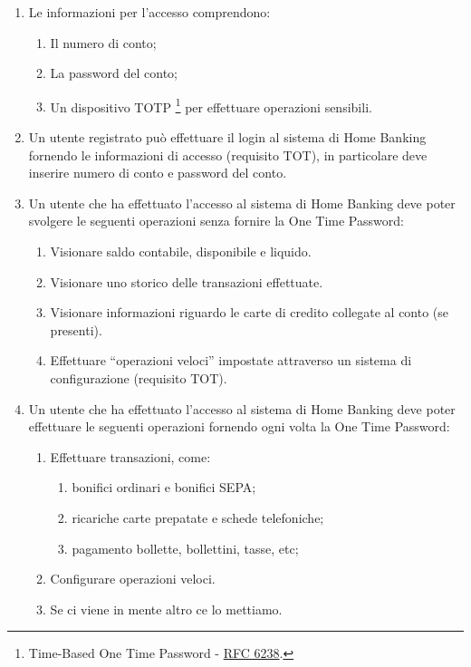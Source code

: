 \documentclass[utf8,draft]{softeng}
\begin{document}
\begin{enumerate}
		Un utente non pre-registrato pu\`o effettuare la procedura completa di registrazione presso una filiale, fornendo le stesse informazioni richieste agli utenti che si pre-registrano online.
	\item Le informazioni per l'accesso comprendono:
		\begin{enumerate}
			\item Il numero di conto;
			\item La password del conto;
			\item Un dispositivo TOTP \footnote{Time-Based One Time Password - \href{https://tools.ietf.org/html/rfc6238}{RFC 6238}.} per effettuare operazioni sensibili.
		\end{enumerate}
	\item Un utente registrato pu\`o effettuare il login al sistema di Home Banking fornendo le informazioni di accesso (requisito TOT), in particolare deve inserire numero di conto e password del conto.
	\item Un utente che ha effettuato l'accesso al sistema di Home Banking deve poter svolgere le seguenti operazioni senza fornire la One Time Password:
		\begin{enumerate}
			\item Visionare saldo contabile, disponibile e liquido.
			\item Visionare uno storico delle transazioni effettuate.
			\item Visionare informazioni riguardo le carte di credito collegate al conto (se presenti).
			\item Effettuare ``operazioni veloci'' impostate attraverso un sistema di configurazione (requisito TOT).
		\end{enumerate}
	\item Un utente che ha effettuato l'accesso al sistema di Home Banking deve poter effettuare le seguenti operazioni fornendo ogni volta la One Time Password:
		\begin{enumerate}
			\item Effettuare transazioni, come:
				\begin{enumerate}
					\item bonifici ordinari e bonifici SEPA;
					\item ricariche carte prepatate e schede telefoniche;
					\item pagamento bollette, bollettini, tasse, etc;
				\end{enumerate}
			\item Configurare operazioni veloci.
			\item Se ci viene in mente altro ce lo mettiamo.

\end{enumerate}
\end{enumerate}
\end{document}
